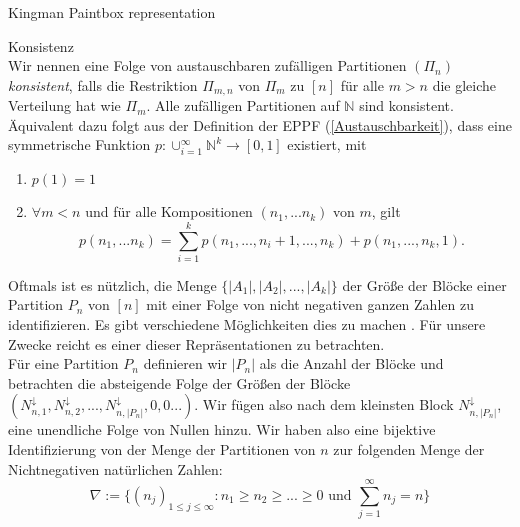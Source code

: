 \begin{section}{Kingman Paintbox representation}
\begin{Definition}{Konsistenz}\\
    Wir nennen eine Folge von austauschbaren zufälligen Partitionen $(\Pi_n)$ \textit{konsistent}, falls die Restriktion $\Pi_{m,n}$ von $\Pi_m$ zu $[n]$ für alle $m > n$ die gleiche Verteilung hat wie $\Pi_m$. Alle zufälligen Partitionen auf $\mathbb{N}$ sind konsistent.
    Äquivalent dazu folgt aus der Definition der EPPF (\ref{Austauschbarkeit}), dass eine symmetrische Funktion  $p: \cup_{i=1}^{\infty} \mathbb{N}^k \to [0,1]$ existiert, mit 
    \begin{enumerate}
        \item $p(1) = 1$
        \item $\forall m < n$ und für alle Kompositionen $(n_1,...n_k)$ von $m$, gilt 
        \[ 
        p(n_1, ... n_k) = \sum_{i=1}^{k}p(n_1, ..., n_i + 1, ..., n_k) + p(n_1,...,n_k,1).
        \]
    \end{enumerate}
\end{Definition}
Oftmals ist es nützlich, die Menge $\{|A_1|,|A_2|,...,|A_k|\}$ der Größe der Blöcke einer Partition $P_n$ von $[n]$ mit einer Folge von nicht negativen ganzen Zahlen zu identifizieren. Es gibt verschiedene Möglichkeiten dies zu machen \cite[Seite 15]{pitman2006combinatorial}. Für unsere Zwecke reicht es einer dieser Repräsentationen zu betrachten.
\\
Für eine Partition $P_n$ definieren wir $|P_n|$ als die Anzahl der Blöcke und betrachten die absteigende Folge der Größen der Blöcke $(N^\downarrow_{n,1},N^\downarrow_{n,2},...,N^\downarrow_{n,|P_n|},0,0...)$. Wir fügen also nach dem kleinsten Block $N^\downarrow_{n,|P_n|}$, eine unendliche Folge von Nullen hinzu. Wir haben also eine bijektive Identifizierung von der Menge der Partitionen von $n$ zur folgenden Menge der Nichtnegativen natürlichen Zahlen:
\[
\nabla := \{(n_j)_{1\leq j \leq \infty}: n_1 \geq n_2 \geq ... \geq 0 \text{ und } \sum_{j=1}^{\infty}{n_j} = n\}
\] 


\end{section}
